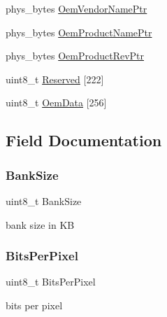 \begin{DoxyCompactItemize}
phys\+\_\+bytes \hyperlink{struct____attribute_____affd3a330afde841405f89bbcd05af4f0}{Oem\+Vendor\+Name\+Ptr}
\item 
phys\+\_\+bytes \hyperlink{struct____attribute_____afd3d28c2078a683b1ed64ea21905fcfe}{Oem\+Product\+Name\+Ptr}
\item 
phys\+\_\+bytes \hyperlink{struct____attribute_____a239cba41d0489da5b79556b45797c6b0}{Oem\+Product\+Rev\+Ptr}
\item 
uint8\+\_\+t \hyperlink{struct____attribute_____a2c3b1cbb6bad5c51d4be4e57255a61d2}{Reserved} \mbox{[}222\mbox{]}
\item 
uint8\+\_\+t \hyperlink{struct____attribute_____a966ae75c33c2d65b4f0c916f093acac0}{Oem\+Data} \mbox{[}256\mbox{]}
\end{DoxyCompactItemize}


\subsection{Field Documentation}
\mbox{\label{struct____attribute_____a7e31ea09e6e6755e3a504b9c76b3f545}} 
\subsubsection{\texorpdfstring{Bank\+Size}{BankSize}}
{\footnotesize\ttfamily uint8\+\_\+t Bank\+Size}



bank size in KB 

\mbox{\label{struct____attribute_____a03756ae144fce823087a2a4255bf4bb1}} 
\subsubsection{\texorpdfstring{Bits\+Per\+Pixel}{BitsPerPixel}}
{\footnotesize\ttfamily uint8\+\_\+t Bits\+Per\+Pixel}



bits per pixel 

\mbox{\label{struct____attribute_____a4d0396c07a4f07556332fec2b4a6c2bf}} 
